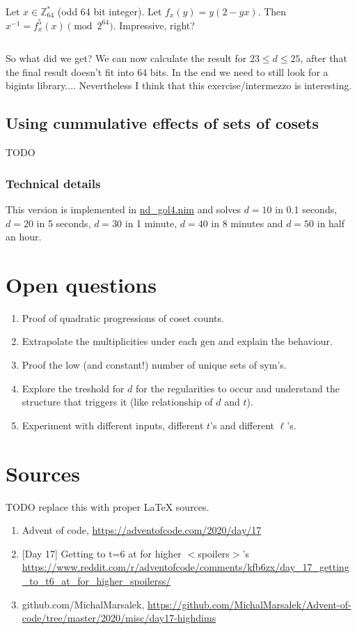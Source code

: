 \documentclass[]{article}
\newcommand{\ZZ}{\mathbb Z}
\newcommand{\sym}{\mathrm{sym}}
\newcommand{\gen}{\mathrm{gen}}
\begin{document}
	Let $x \in \ZZ_{64}^*$ (odd 64 bit integer). Let $f_x(y) = y(2-yx)$. Then $x^{-1} = f_x^5(x) \pmod{2^{64}}$. Impressive, right?
	
	$ $
	
	So what did we get? We can now calculate the result for $23 \leq d \leq 25$, after that the final result doesn't fit into 64 bits. In the end we need to still look for a bigints library.... Nevertheless I think that this exercise/intermezzo is interesting.
	
	\subsection{Using cummulative effects of sets of cosets}
	TODO
	
	\subsubsection{Technical details}
	
	This version is implemented in \href{https://github.com/MichalMarsalek/Advent-of-code/blob/master/2020/misc/day17-highdims/nd_gol3.nim}{nd\_gol4.nim} and solves $d=10$ in 0.1 seconds, $d=20$ in 5 seconds, $d=30$ in 1 minute, $d=40$ in 8 minutes and $d=50$ in half an hour.
	
	\section{Open questions}
	\begin{enumerate}
		\item Proof of quadratic progressions of coset counts.
		\item Extrapolate the multiplicities under each $\gen$ and explain the behaviour.
		\item Proof the low (and constant!) number of unique sets of $\sym$'s.
		\item Explore the treshold for $d$ for the regularities to occur and understand the structure that triggers it (like relationship of $d$ and $t$).
		\item Experiment with different inputs, different $t$'s and different $\ell$'s.
	\end{enumerate}
	
	
	\newpage
	\section{Sources}
	TODO replace this with proper \LaTeX $ $ $ $sources.
	
	\begin{enumerate}
		\item Advent of code, \url{https://adventofcode.com/2020/day/17}
		\item {}[Day 17] Getting to t=6 at for higher $<$spoilers$>$'s \url{https://www.reddit.com/r/adventofcode/comments/kfb6zx/day_17_getting_to_t6_at_for_higher_spoilerss/}
		\item github.com/MichalMarsalek, \url{https://github.com/MichalMarsalek/Advent-of-code/tree/master/2020/misc/day17-highdims}
	\end{enumerate}
\end{document}
